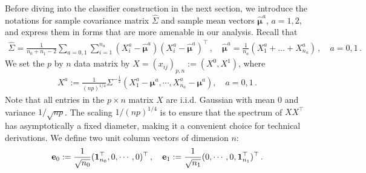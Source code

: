 \documentclass[12pt]{article}
\numberwithin{equation}{section}
\theoremstyle{remark}
\newcommand{\1}{{\rm 1}\kern-0.24em{\rm I}}
\begin{document}
%


Before diving into the classifier construction in the next section, we introduce the notations for sample covariance matrix $\widehat \Sigma$ and sample mean vectors $\hat {\bm{\mu}}^a$, $a= 1, 2$, and express them in forms that are more amenable in our analysis. Recall that 
\begin{align*}
\widehat \Sigma = \frac{1}{n_0+n_1-2}\sum_{a=0,1}\sum_{i=1}^{n_a}(X^a_i - \hat {\bm{\mu}}^a)(X^a_i - \hat {\bm{\mu}}^a)^{\top} \,,\quad \hat {\bm{\mu}}^a = \frac{1}{n_a}\left(X^a_1 + \ldots +X^a_{n_a}\right)\,, \quad a=0,1\,.
\end{align*}
We set  the $p$ by $n$ data matrix  by ${X}=(x_{ij})_{p,n}:= ({X}^0, {X}^1)$,  where 
\begin{align*}
{{X}}^a :=\frac{1}{(np)^{1/4}}\Sigma^{-\frac 12} (X_1^a- {\bm{\mu}}^a, \cdots, X_{n_a}^a- {\bm{\mu}}^a), \quad a=0,1\,.
\end{align*}
Note that all entries in the $p\times n$ matrix ${X}$ are i.i.d. Gaussian  with mean $0$ and variance $1/\sqrt{np}$. The scaling ${1}/{(np)^{1/4}}$ is to ensure that the spectrum of $XX^{\top} $ has asymptotically a fixed diameter, making it a convenient choice for technical derivations.  
We define two unit column vectors  of dimension $n$:
\begin{align} \label{def:e_0e_1}
{\bf{e}}_0:= \frac{1}{\sqrt{n_0}} ({\bf{1}}_{n_0}^{\top}, 0, \cdots, 0)^{\top}\,, \quad {\bf{e}}_1:= \frac{1}{\sqrt{n_1}} ( 0, \cdots, 0, {\bf{1}}_{n_1}^{\top} )^{\top}\,.
\end{align}
\end{document}
